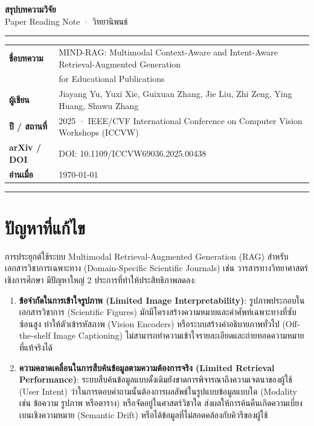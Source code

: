 \documentclass[10pt,a4paper]{article}
\begin{document}
\begin{center}
  {\Large \textbf{สรุปบทความวิจัย}}\\[6pt]
  {\color{muted}\small Paper Reading Note · วิทยานิพนธ์}
\end{center}

\noindent\rule{\textwidth}{1.5pt}

\vspace{12pt}
\noindent
\begin{tabular}{@{}ll@{}}
  \textbf{ชื่อบทความ}  & MIND-RAG: Multimodal Context-Aware and Intent-Aware Retrieval-Augmented Generation\\
                      & for Educational Publications \\[4pt]
  \textbf{ผู้เขียน}    & Jiayang Yu, Yuxi Xie, Guixuan Zhang, Jie Liu, Zhi Zeng, Ying Huang, Shuwu Zhang \\[4pt]
  \textbf{ปี / สถานที่} & 2025 · IEEE/CVF International Conference on Computer Vision Workshops (ICCVW) \\[4pt]
  \textbf{arXiv / DOI}  & DOI: 10.1109/ICCVW69036.2025.00438 \\[4pt]
  \textbf{อ่านเมื่อ}   & \today \\
\end{tabular}

\vspace{12pt}
\noindent\rule{\textwidth}{0.4pt}

\section*{ปัญหาที่แก้ไข}

การประยุกต์ใช้ระบบ Multimodal Retrieval-Augmented Generation (RAG) สำหรับเอกสารวิชาการเฉพาะทาง (Domain-Specific Scientific Journals) เช่น วารสารทางวิทยาศาสตร์เชิงการศึกษา มีปัญหาใหญ่ 2 ประการที่ทำให้ประสิทธิภาพลดลง:
\begin{enumerate}
  \item \textbf{ข้อจำกัดในการเข้าใจรูปภาพ (Limited Image Interpretability)}: รูปภาพประกอบในเอกสารวิชาการ (Scientific Figures) มักมีโครงสร้างความหมายและคำศัพท์เฉพาะทางที่ซับซ้อนสูง ทำให้ตัวเข้ารหัสภาพ (Vision Encoders) หรือระบบสร้างคำอธิบายภาพทั่วไป (Off-the-shelf Image Captioning) ไม่สามารถทำความเข้าใจรายละเอียดและถ่ายทอดความหมายที่แท้จริงได้
  \item \textbf{ความคลาดเคลื่อนในการสืบค้นข้อมูลตามความต้องการจริง (Limited Retrieval Performance)}: ระบบสืบค้นข้อมูลแบบดั้งเดิมยังขาดการพิจารณาถึงความเจตนาของผู้ใช้ (User Intent) ว่าในการตอบคำถามนั้นต้องการผลลัพธ์ในรูปแบบข้อมูลแบบใด (Modality เช่น ข้อความ รูปภาพ หรือตาราง) หรือจัดอยู่ในศาสตร์วิชาใด ส่งผลให้การค้นคืนเกิดความเบี่ยงเบนเชิงความหมาย (Semantic Drift) หรือได้ข้อมูลที่ไม่สอดคล้องกับคิวรีของผู้ใช้
\end{enumerate}
\end{document}
